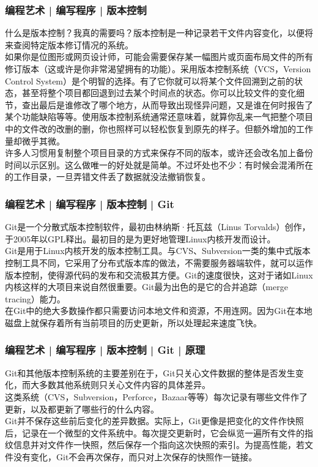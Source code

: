 \begin{frame}
  \frametitle{编程艺术 | 编写程序 | 版本控制}
  什么是版本控制？我真的需要吗？版本控制是一种记录若干文件内容变化，以便将来查阅特定版本修订情况的系统。\\
  \vspace{1em}
  如果你是位图形或网页设计师，可能会需要保存某一幅图片或页面布局文件的所有修订版本（这或许是你非常渴望拥有的功能）。采用版本控制系统（VCS，Version Control System）是个明智的选择。有了它你就可以将某个文件回溯到之前的状态，甚至将整个项目都回退到过去某个时间点的状态。你可以比较文件的变化细节，查出最后是谁修改了哪个地方，从而导致出现怪异问题，又是谁在何时报告了某个功能缺陷等等。使用版本控制系统通常还意味着，就算你乱来一气把整个项目中的文件改的改删的删，你也照样可以轻松恢复到原先的样子。但额外增加的工作量却微乎其微。\\
  \vspace{1em}
  许多人习惯用复制整个项目目录的方式来保存不同的版本，或许还会改名加上备份时间以示区别。这么做唯一的好处就是简单。不过坏处也不少：有时候会混淆所在的工作目录，一旦弄错文件丢了数据就没法撤销恢复。
\end{frame}

\begin{frame}
  \frametitle{编程艺术 | 编写程序 | 版本控制 | Git}
  Git是一个分散式版本控制软件，最初由林纳斯·托瓦兹（Linus Torvalds）创作，于2005年以GPL释出。最初目的是为更好地管理Linux内核开发而设计。\\
  \vspace{1em}
 Git是用于Linux内核开发的版本控制工具。与CVS、Subversion一类的集中式版本控制工具不同，它采用了分布式版本库的做法，不需要服务器端软件，就可以运作版本控制，使得源代码的发布和交流极其方便。Git的速度很快，这对于诸如Linux内核这样的大项目来说自然很重要。Git最为出色的是它的合并追踪（merge tracing）能力。\\
  \vspace{1em}
  在Git中的绝大多数操作都只需要访问本地文件和资源，不用连网。因为Git在本地磁盘上就保存着所有当前项目的历史更新，所以处理起来速度飞快。
\end{frame}

\begin{frame}
  \frametitle{编程艺术 | 编写程序 | 版本控制 | Git | 原理}
  Git和其他版本控制系统的主要差别在于，Git只关心文件数据的整体是否发生变化，而大多数其他系统则只关心文件内容的具体差异。\\
  \vspace{1em}
  这类系统（CVS，Subversion，Perforce，Bazaar等等）每次记录有哪些文件作了更新，以及都更新了哪些行的什么内容。\\
  \vspace{1em}
  Git并不保存这些前后变化的差异数据。实际上，Git更像是把变化的文件作快照后，记录在一个微型的文件系统中。每次提交更新时，它会纵览一遍所有文件的指纹信息并对文件作一快照，然后保存一个指向这次快照的索引。为提高性能，若文件没有变化，Git不会再次保存，而只对上次保存的快照作一链接。
\end{frame}

